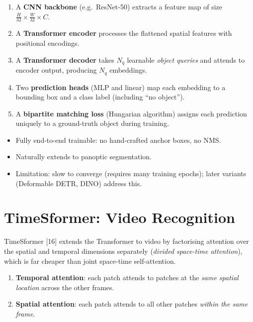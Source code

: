 \documentclass[12pt,a4paper]{report}
\begin{document}
\begin{enumerate}[itemsep=2pt]
    \item A \textbf{CNN backbone} (e.g.\ ResNet-50) extracts a feature map
          of size $\frac{H}{32}\times\frac{W}{32}\times C$.
    \item A \textbf{Transformer encoder} processes the flattened spatial
          features with positional encodings.
    \item A \textbf{Transformer decoder} takes $N_q$ learnable
          \emph{object queries} and attends to encoder output, producing
          $N_q$ embeddings.
    \item Two \textbf{prediction heads} (MLP and linear) map each embedding
          to a bounding box and a class label (including ``no object'').
    \item A \textbf{bipartite matching loss} (Hungarian algorithm) assigns each
          prediction uniquely to a ground-truth object during training.
\end{enumerate}

\begin{importantbox}
\begin{itemize}[itemsep=1pt]
    \item Fully end-to-end trainable: no hand-crafted anchor boxes, no NMS.
    \item Naturally extends to panoptic segmentation.
    \item Limitation: slow to converge (requires many training epochs); later
          variants (Deformable DETR, DINO) address this.
\end{itemize}
\end{importantbox}

\section{TimeSformer: Video Recognition}

TimeSformer [16] extends the Transformer to video by
factorising attention over the spatial and temporal dimensions separately
(\emph{divided space-time attention}), which is far cheaper than joint
space-time self-attention.

\begin{enumerate}[itemsep=2pt]
    \item \textbf{Temporal attention}: each patch attends to patches at the
          \emph{same spatial location} across the other frames.
    \item \textbf{Spatial attention}: each patch attends to all other patches
          \emph{within the same frame}.
\end{enumerate}
\end{document}
